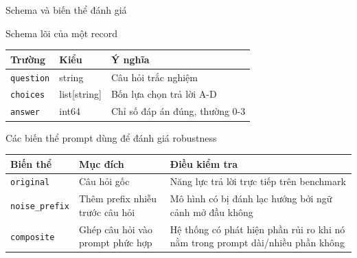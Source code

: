 \documentclass[t, aspectratio=169]{beamer}
\newcommand{\code}[1]{\texttt{#1}}
\newcommand{\rowrule}{\midrule[0.25pt]}
\begin{document}
\begin{frame}{Schema và biến thể đánh giá}
  \scriptsize
  \begin{block}{Schema lõi của một record}
    \begin{tabularx}{\textwidth}{l l Y}
      \toprule
      \textbf{Trường} & \textbf{Kiểu} & \textbf{Ý nghĩa} \\
      \midrule
      \code{question} & string & Câu hỏi trắc nghiệm \\
      \rowrule
      \code{choices} & list[string] & Bốn lựa chọn trả lời A-D \\
      \rowrule
      \code{answer} & int64 & Chỉ số đáp án đúng, thường 0-3 \\
      \bottomrule
    \end{tabularx}
  \end{block}

  \vspace{0.35em}
  \begin{block}{Các biến thể prompt dùng để đánh giá robustness}
    \begin{tabularx}{\textwidth}{l Y Y}
      \toprule
      \textbf{Biến thể} & \textbf{Mục đích} & \textbf{Điều kiểm tra} \\
      \midrule
      \code{original} & Câu hỏi gốc & Năng lực trả lời trực tiếp trên benchmark \\
      \rowrule
      \code{noise\_prefix} & Thêm prefix nhiễu trước câu hỏi & Mô hình có bị đánh lạc hướng bởi ngữ cảnh mở đầu không \\
      \rowrule
      \code{composite} & Ghép câu hỏi vào prompt phức hợp & Hệ thống có phát hiện phần rủi ro khi nó nằm trong prompt dài/nhiều phần không \\
      \bottomrule
    \end{tabularx}
  \end{block}
\end{frame}
\end{document}
